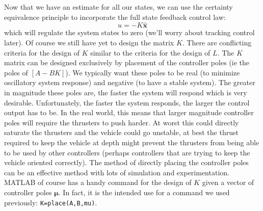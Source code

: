 \documentclass{article}
\begin{document}
Now that we have an estimate for all our states, we can use the certainty equivalence principle to incorporate the full state feedback control law: 
\begin{equation}
\label{eq:equivalencePrinciple}
u=-K\pmb{\hat{x}} 
\end{equation}
which will regulate the system states to zero (we'll worry about tracking control later).  Of course we still have yet to design the matrix $K$.  There are conflicting criteria for the design of $K$ similar to the criteria for the design of $L$.  The $K$ matrix can be designed exclusively by placement of the controller poles (ie the poles of $[A-BK]$).  We typically want these poles to be real (to minimize oscillatory system response) and negative (to have a stable system).  The greater in magnitude these poles are, the faster the system will respond which is very desirable.  Unfortunately, the faster the system responds, the larger the control output has to be.  In the real world, this means that larger magnitude controller poles will require the thrusters to push harder.  At worst this could directly saturate the thrusters and the vehicle could go unstable, at best the thrust required to keep the vehicle at depth might prevent the thrusters from being able to be used by other controllers (perhaps controllers that are trying to keep the vehicle oriented correctly).  The method of directly placing the controller poles can be an effective method with lots of simulation and experimentation.  MATLAB of course has a handy command for the design of $K$ given a vector of controller poles $\pmb{\mu}$.  In fact, it is the intended use for a command we used previously: \verb+K=place(A,B,mu)+.
\end{document}

